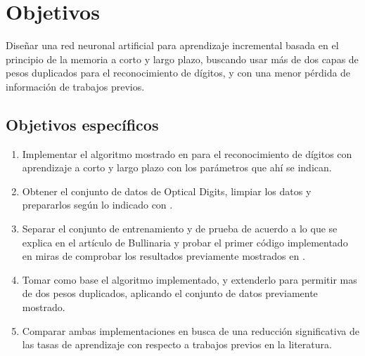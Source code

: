 \chapter{Objetivos}
    Diseñar una red neuronal artificial para aprendizaje incremental basada en el principio de la memoria a corto y largo plazo, buscando usar más de dos capas de pesos duplicados para el reconocimiento de dígitos, y con una menor p\'erdida de información de trabajos previos.
    \section{Objetivos específicos}
        \begin{enumerate}
            \item Implementar el algoritmo mostrado en \cite{bullinaria2009} para el reconocimiento de dígitos con aprendizaje a corto y largo plazo con los parámetros que ahí se indican.
            \item Obtener el conjunto de datos de Optical Digits, limpiar los datos y prepararlos según lo indicado con \cite{bullinaria2009}.
            \item Separar el conjunto de entrenamiento y de prueba de acuerdo a lo que se explica en el artículo de Bullinaria y probar el primer código implementado en miras de comprobar los resultados previamente mostrados en \cite{bullinaria2009}.
            \item Tomar como base el algoritmo implementado, y extenderlo para permitir mas de dos pesos duplicados, aplicando el conjunto de datos previamente mostrado.
            \item Comparar ambas implementaciones en busca de una reducción significativa de las tasas de aprendizaje con respecto a trabajos previos en la literatura.
        \end{enumerate}